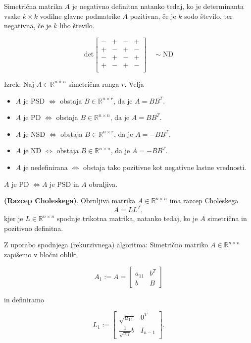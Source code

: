 \documentclass{article}
\begin{document}
\begin{multicols}{2}
	Simetrična matrika \( A \) je negativno definitna natanko tedaj, ko je determinanta vsake \( k \times k \) vodilne glavne podmatrike \( A \) pozitivna, če je \( k \) sodo število, ter negativna, če je \( k \) liho število.

	\[
		\text{det} \left[
			\begin{array}{cccc}
				- & + & - & + \\
				+ & - & + & - \\
				- & + & - & + \\
				+ & - & + & - \\
			\end{array}
			\right] \quad \sim \text{ND}
	\]

	Izrek: Naj \( A \in \mathbb{R}^{n \times n} \) simetrična ranga \( r \). Velja
	\begin{itemize}
		\item \( A \) je PSD \( \Leftrightarrow \) obstaja \( B \in \mathbb{R}^{n \times r} \), da je \( A = BB^T \).
		\item \( A \) je PD \( \Leftrightarrow \) obstaja \( B \in \mathbb{R}^{n \times n} \), da je \( A = BB^T \).
		\item \( A \) je NSD \( \Leftrightarrow \) obstaja \( B \in \mathbb{R}^{n \times r} \), da je \( A = -BB^T \).
		\item \( A \) je ND \( \Leftrightarrow \) obstaja \( B \in \mathbb{R}^{n \times n} \), da je \( A = -BB^T \).
		\item \( A \) je nedefinirana \( \Leftrightarrow \) obstaja tako pozitivne kot negativne lastne vrednosti.
	\end{itemize}
	\( A \) je PD \( \Leftrightarrow A \) je PSD in \( A \) obrnljiva.

	\textbf{(Razcep Choleskega)}. Obrnljiva matrika \( A \in \mathbb{R}^{n \times n} \) ima razcep Choleskega
	\[ A = LL^T, \]
	kjer je \( L \in \mathbb{R}^{n \times n} \) spodnje trikotna matrika, natanko tedaj, ko je \( A \) simetrična in pozitivno definitna.

	Z uporabo spodnjega (rekurzivnega) algoritma:
	Simetrično matriko \( A \in \mathbb{R}^{n \times n} \) zapišemo v bločni obliki

	\[
		A_1 := A = \begin{bmatrix}
			a_{11} & b^T \\
			b      & B
		\end{bmatrix}
	\]

	in definiramo

	\[
		L_1 := \begin{bmatrix}
			\sqrt{a_{11}}             & 0^T     \\
			\frac{1}{\sqrt{a_{11}}} b & I_{n-1}
		\end{bmatrix}.
	\]


\end{multicols}
\end{document}
